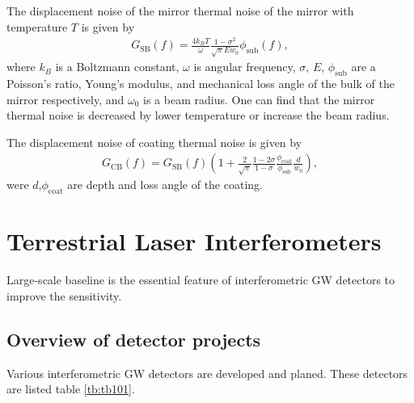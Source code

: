 The displacement noise of the mirror thermal noise of the mirror with temperature $T$ is given by \cite{levin1998internal,numata2003wide}
\begin{eqnarray}
  G_{\mathrm{SB}}(f)=\frac{4 k_{B} T}{\omega} \frac{1-\sigma^{2}}{\sqrt{\pi} E w_{0}} \phi_{\mathrm{sub}}(f),
  \label{eq:eq140}
\end{eqnarray}
where $k_{B}$ is a Boltzmann constant, $\omega$ is angular frequency, $\sigma,\,E,\, \phi_{\mathrm{sub}}$ are a Poisson's ratio, Young's modulus, and mechanical loss angle of the bulk of the mirror respectively, and $\omega_0$ is a beam radius. One can find that the mirror thermal noise is decreased by lower temperature or increase the beam radius.

The displacement noise of coating thermal noise is given by \cite{numata2003wide,harry2002thermal}
\begin{eqnarray}
  G_{\mathrm{CB}}(f)=G_{\mathrm{SB}}(f)\left(1+\frac{2}{\sqrt{\pi}} \frac{1-2 \sigma}{1-\sigma} \frac{\phi_{\mathrm{coat}}}{\phi_{\mathrm{sub}}} \frac{d}{w_{0}}\right), 
\end{eqnarray}
were $d$,$\phi_{\mathrm{coat}}$ are depth and loss angle of the coating.


\section{Terrestrial Laser Interferometers} \label{sec:14}
Large-scale baseline is the essential feature of interferometric GW detectors to improve the sensitivity. 

\subsection{Overview of detector projects}
Various interferometric GW detectors are developed and planed. These detectors are listed table \ref{tb:tb101}. 

